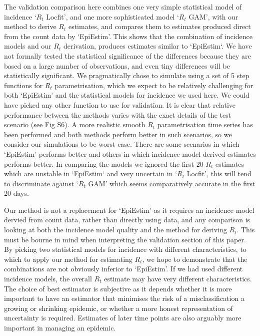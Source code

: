 \documentclass[10pt,letterpaper]{article}
\begin{document}
The validation comparison here combines one very simple statistical model of incidence `$R_t$ Locfit', and one more sophisticated model `$R_t$ GAM', with our method to derive $R_t$ estimates, and compares them to estimates produced direct from the count data by `EpiEstim'. This shows that the combination of incidence models and our $R_t$ derivation, produces estimates similar to `EpiEstim`. We have not formally tested the statistical significance of the differences because they are based on a large number of observations, and even tiny differences will be statistically significant. We pragmatically chose to simulate using a set of 5 step functions for $R_t$ parametrisation, which we expect to be relatively challenging for both `EpiEstim' and the statistical models for incidence we used here. We could have picked any other function to use for validation. It is clear that relative performance between the methods varies with the exact details of the test scenario (see  Fig S6). A more realistic smooth $R_t$ parametrisation time series has been performed and both methods perform better in such scenarios, so we consider our simulations to be worst case. There are some scenarios in which `EpiEstim' performs better and others in which incidence model derived estimates performs better. In comparing the models we ignored the first 20 $R_t$ estimates which are unstable in `EpiEstim` and very uncertain in `$R_t$ Locfit', this will tend to discriminate against `$R_t$ GAM' which seems comparatively accurate in the first 20 days.

Our method is not a replacement for `EpiEstim' as it requires an incidence model dervied from count data, rather than directly using data, and any comparison is looking at both the incidence model quality and the method for deriving $R_t$. This must be bourne in mind when interpreting the validation section of this paper. By picking two statistical models for incidence with different characteristics, to which to apply our method for estimating $R_t$, we hope to demonstrate that the combinations are not obviously inferior to `EpiEstim'. If we had used different incidence models, the overall $R_t$ estimate may have very different characteristics. The choice of best estimator is subjective as it depends whether it is more important to have an estimator that minimises the risk of a misclassification a growing or shrinking epidemic, or whether a more honest representation of uncertainty is required. Estimates of later time points are also arguably more important in managing an epidemic.
\end{document}

